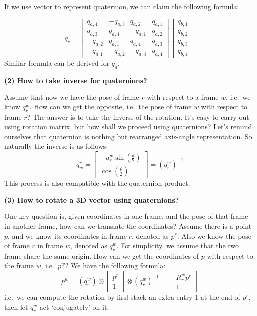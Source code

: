 \documentclass[
]{book}
\theoremstyle{definition}
\theoremstyle{definition}
\theoremstyle{definition}
\theoremstyle{definition}
\theoremstyle{remark}
\begin{document}
If we use vector to represent quaternion, we can claim the following formula:

\[ q_c = \begin{bmatrix} q_{a,4} & -q_{a,3} & q_{a,2} & q_{a,1}\\
q_{a,3} & q_{a,4} &-q_{a,1} &q_{a,2} \\
-q_{a,2} & q_{a,1} & q_{a,4} &q_{a,3} \\
-q_{a,1} & -q_{a,2} & -q_{a,3} &q_{a,4}\end{bmatrix} \begin{bmatrix} q_{b,1}\\q_{b,2}\\q_{b,3}\\q_{b,4}\end{bmatrix} \] Similar formula can be derived for \(q_a\).

\textbf{(2) How to take inverse for quaternions?}

Assume that now we have the pose of frame \(r\) with respect to a frame \(w\), i.e.~we know \(q_r^w\). How can we get the opposite, i.e.~the pose of frame \(w\) with respect to frame \(r\)? The answer is to take the inverse of the rotation. It's easy to carry out using rotation matrix, but how shall we proceed using quaternions? Let's remind ourselves that quaternion is nothing but rearranged axis-angle representation. So naturally the inverse is as follows:
\[q_w^r = \begin{bmatrix}-u_r^w\sin(\frac{\theta}{2}) \\ \cos(\frac{\theta}{2})\end{bmatrix} = (q_r^w)^{-1}\]
This process is also compatible with the quaternion product.

\textbf{(3) How to rotate a 3D vector using quaternions?}

One key question is, given coordinates in one frame, and the pose of that frame in another frame, how can we translate the coordinates? Assume there is a point \(p\), and we know its coordinates in frame \(r\), denoted as \(p^r\). Also we know the pose of frame \(r\) in frame \(w\), denoted as \(q_r^w\). For simplicity, we assume that the two frame share the same origin. How can we get the coordinates of \(p\) with respect to the frame \(w\), i.e.~\(p^w\)? We have the following formula:
\[p^w = (q^w_r)\otimes\begin{bmatrix} p^r\\1\end{bmatrix}\otimes(q^w_r)^{-1} = \begin{bmatrix} R^w_rp^r\\1\end{bmatrix}\]
i.e.~we can compute the rotation by first stack an extra entry 1 at the end of \(p^r\), then let \(q^w_r\) act `conjugately' on it.
\end{document}
